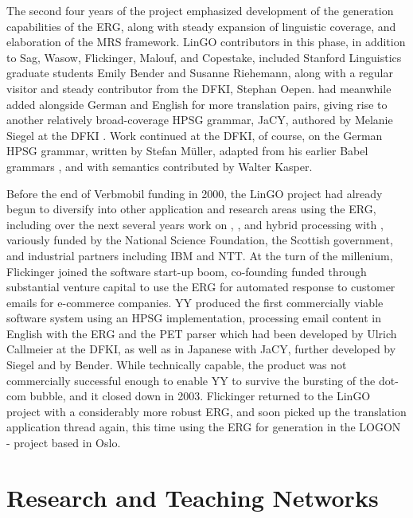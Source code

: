 \documentclass[output=paper]{langsci/langscibook}
\begin{document}
The second four years of the \verbmobil project emphasized development of the generation capabilities of the ERG, along with steady expansion of linguistic coverage, and elaboration of the MRS framework.  LinGO contributors in this phase, in addition to Sag, Wasow, Flickinger, Malouf, and Copestake, included Stanford Linguistics graduate students Emily Bender and Susanne Riehemann, along with a regular visitor and steady contributor from the DFKI, Stephan Oepen.  \verbmobil had meanwhile added  alongside German \citep{MK2000a} and English \citep*{FCS2000a} for more translation pairs, giving rise to another relatively broad-coverage HPSG grammar, JaCY, authored by Melanie Siegel at the DFKI \citep{Siegel2000a}.  Work continued at the DFKI, of course, on the German HPSG grammar, written by Stefan M{\"u}ller, adapted from his earlier Babel grammars \citep{Mueller99a}, and with semantics contributed by Walter Kasper.

Before the end of Verbmobil funding in 2000, the LinGO project had already begun to diversify into other application and research areas using the ERG, including over the next several years work on , , and hybrid processing with , variously funded by the National Science Foundation, the Scottish government, and industrial partners including IBM and NTT.  At the turn of the millenium, Flickinger joined the software start-up boom, co-founding  funded through substantial venture capital to use the ERG for automated response to customer emails for e-commerce companies.  YY produced the first commercially viable software system using an HPSG implementation, processing email content in English with the ERG and the PET parser \citep{callmeier00} which had been developed by Ulrich Callmeier at the DFKI, as well as in Japanese with JaCY, further developed by Siegel and by Bender.  While technically capable, the product was not commercially successful enough to enable YY to survive the bursting of the dot-com bubble, and it closed down in 2003.  Flickinger returned to the LinGO project with a considerably more robust ERG, and soon picked up the translation application thread again, this time using the ERG for generation in the LOGON -  project based in Oslo.


\section{Research and Teaching Networks}
\end{document}
